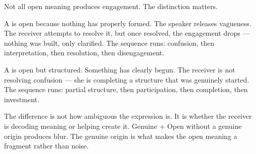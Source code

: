 Not all open meaning produces engagement. 
The distinction matters.

A  is open because nothing has properly formed. 
The speaker releases vagueness. The receiver attempts to resolve it, 
but once resolved, the engagement drops --- nothing was built, only clarified. 
The sequence runs: confusion, then interpretation, then resolution, then 
disengagement.

A  is open but structured. 
Something has clearly begun. The receiver is not resolving 
confusion --- she is completing a structure that was genuinely started. 
The sequence runs: partial structure, then participation, then completion, then 
investment.

The difference is not how ambiguous the expression is. It is whether the 
receiver is decoding meaning or helping create it. 
Genuine + Open without a genuine origin produces blur. 
The genuine origin is what makes the open meaning a fragment rather than noise.

